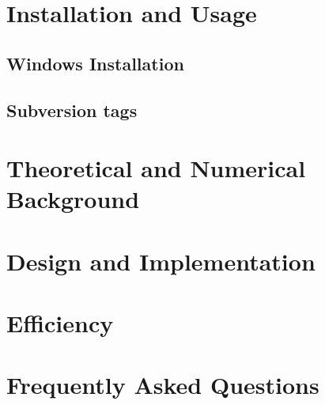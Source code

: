 \documentclass[letterpaper,twoside,openright,10pt]{memoir}
\begin{document}



\chapter{Installation and Usage}
\label{chap:Installation}




\section{Windows Installation}
\label{sec:WindowsInstallation}




\section{Subversion tags}
\label{sec:SVN}




\chapter{Theoretical and Numerical Background}
\label{chap:Numerics}





\chapter{Design and Implementation}
\label{chap:Design}





\chapter{Efficiency}
\label{chap:Efficiency}




\chapter{Frequently Asked Questions}
\label{chap:FAQ}
\end{document}
